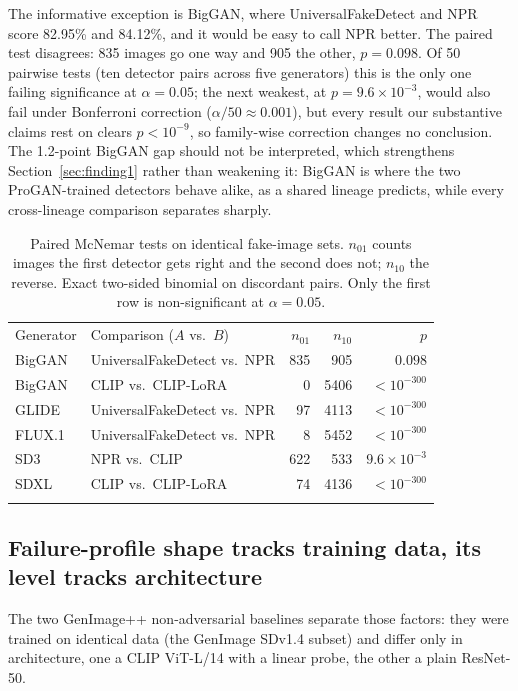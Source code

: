 \documentclass[3p,times,procedia]{elsarticle}
\begin{document}
The informative exception is BigGAN, where UniversalFakeDetect and NPR
score 82.95\% and 84.12\%, and it would be easy to call NPR better. The
paired test disagrees: 835 images go one way and 905 the other,
$p=0.098$. Of 50 pairwise tests (ten detector pairs across five
generators) this is the only one failing significance at $\alpha=0.05$;
the next weakest, at $p=9.6\times10^{-3}$, would also fail under Bonferroni
correction ($\alpha/50\approx0.001$), but every result our substantive
claims rest on clears $p<10^{-9}$, so family-wise correction changes no
conclusion. The 1.2-point BigGAN gap should not be interpreted, which
strengthens Section~\ref{sec:finding1} rather than weakening it: BigGAN is
where the two ProGAN-trained detectors behave alike, as a shared lineage
predicts, while every cross-lineage comparison separates sharply.

\begin{table}[h]
\caption{Paired McNemar tests on identical fake-image sets. $n_{01}$ counts
images the first detector gets right and the second does not; $n_{10}$ the
reverse. Exact two-sided binomial on discordant pairs. Only the first row
is non-significant at $\alpha=0.05$.}
\label{tab:mcnemar}
\begin{tabular*}{\hsize}{@{\extracolsep{\fill}}llrrr@{}}
\toprule
Generator & Comparison ($A$ vs.\ $B$) & $n_{01}$ & $n_{10}$ & $p$ \\
\colrule
BigGAN & UniversalFakeDetect vs.\ NPR & 835 & 905 & $0.098$ \\
BigGAN & CLIP vs.\ CLIP-LoRA & 0 & 5406 & $<10^{-300}$ \\
GLIDE & UniversalFakeDetect vs.\ NPR & 97 & 4113 & $<10^{-300}$ \\
FLUX.1 & UniversalFakeDetect vs.\ NPR & 8 & 5452 & $<10^{-300}$ \\
SD3 & NPR vs.\ CLIP & 622 & 533 & $9.6\times10^{-3}$ \\
SDXL & CLIP vs.\ CLIP-LoRA & 74 & 4136 & $<10^{-300}$ \\
\botrule
\end{tabular*}
\end{table}

\subsection{Failure-profile shape tracks training data, its level
tracks architecture}
\label{sec:finding-shape}

The two GenImage++ non-adversarial baselines separate those factors: they
were trained on identical data (the GenImage SDv1.4 subset) and differ
only in architecture, one a CLIP ViT-L/14 with a linear probe, the other a
plain ResNet-50.
\end{document}
